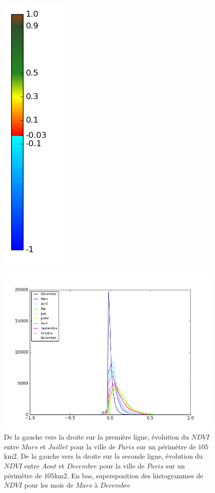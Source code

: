 \documentclass{book}
\begin{document}
\begin{figure}[H]
{\includegraphics[scale=0.2]{images/colormap.png}
}
\begin{center}
\includegraphics[scale=0.45]{images/Paris/all_ndvi_histo.png}
\end{center}
\caption{De la gauche vers la droite sur la première ligne, évolution du $NDVI$ entre $Mars$ et $Juillet$ pour la ville de $Paris$ sur un périmètre de $105$km2.
De la gauche vers la droite sur la seconde ligne, évolution du $NDVI$ entre $Aout$ et $Decembre$ pour la ville de $Paris$ sur un périmètre de $105$km2. 
En bas, supersposition des histogrammes de $NDVI$ pour les mois de $Mars$ à $Decembre$}
\label{paris_ndvi_annee}
\end{figure}
\end{document}
